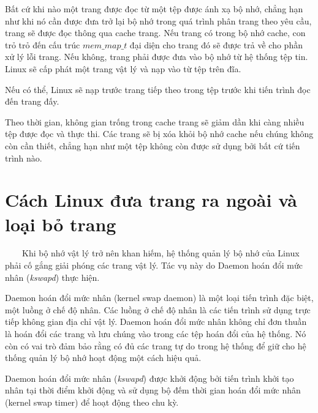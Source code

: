 \documentclass{article}
\begin{document}
Bất cứ khi nào một trang được đọc từ một tệp được ánh xạ bộ nhớ, chẳng hạn như khi nó cần được đưa trở lại bộ nhớ trong quá trình phân trang theo yêu cầu, trang sẽ được đọc thông qua cache trang. Nếu trang có trong bộ nhớ cache, con trỏ trỏ đến cấu trúc $mem\_map\_t$ đại diện cho trang đó sẽ được trả về cho phần xử lý lỗi trang. Nếu không, trang phải được đưa vào bộ nhớ từ hệ thống tệp tin. Linux sẽ cấp phát một trang vật lý và nạp vào từ tệp trên đĩa.\vspace{1em}

Nếu có thể, Linux sẽ nạp trước trang tiếp theo trong tệp trước khi tiến trình đọc đến trang đấy.\vspace{1em}

Theo thời gian, không gian trống trong cache trang sẽ giảm dần khi càng nhiều tệp được đọc và thực thi. Các trang sẽ bị xóa khỏi bộ nhớ cache nếu chúng không còn cần thiết, chẳng hạn như một tệp không còn được sử dụng bởi bất cứ tiến trình nào.

\section{Cách Linux đưa trang ra ngoài và loại bỏ trang}

~~~~Khi bộ nhớ vật lý trở nên khan hiếm, hệ thống quản lý bộ nhớ của Linux phải cố gắng giải phóng các trang vật lý. Tác vụ này do Daemon hoán đổi mức nhân (\textit{kswapd}) thực hiện.\vspace{1em}

Daemon hoán đổi mức nhân (kernel swap daemon) là một loại tiến trình đặc biệt, một luồng ở chế độ nhân. Các luồng ở chế độ nhân là các tiến trình sử dụng trực tiếp không gian địa chỉ vật lý. Daemon hoán đổi mức nhân không chỉ đơn thuần là hoán đổi các trang và lưu chúng vào trong các tệp hoán đổi của hệ thống. Nó còn có vai trò đảm bảo rằng có đủ các trang tự do trong hệ thống để giữ cho hệ thống quản lý bộ nhớ hoạt động một cách hiệu quả.\vspace{1em}

Daemon hoán đổi mức nhân (\textit{kswapd}) được khởi động bởi tiến trình khởi tạo nhân tại thời điểm khởi động và sử dụng bộ đếm thời gian hoán đổi mức nhân (kernel swap timer) để hoạt động theo chu kỳ.\vspace{1em}
\end{document}

